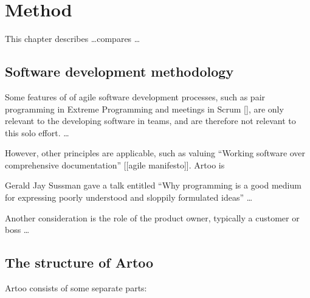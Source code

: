 \chapter{Method}

This chapter describes \ldots compares \ldots


\section{Software development methodology}

Some features of of agile software development processes, such as pair programming in Extreme Programming \cite{xpparr} and meetings in Scrum [], are only relevant to the developing software in teams, and are therefore not relevant to this solo effort. \ldots

However, other principles are applicable, such as valuing ``Working software over comprehensive documentation'' [[agile manifesto]]. Artoo is 

Gerald Jay Sussman gave a talk entitled ``Why programming is a good medium for expressing poorly understood and sloppily formulated ideas'' \ldots


Another consideration is the role of the product owner, typically a customer or boss \ldots 





\section{The structure of Artoo}

Artoo consists of some separate parts:

